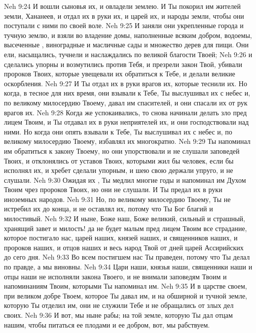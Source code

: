 \vs Neh 9:24 И вошли сыновья их, и овладели землею. И Ты покорил им жителей земли, Хананеев, и отдал их в руки их, и царей их, и народы земли, чтобы они поступали с ними по своей воле.
\vs Neh 9:25 И заняли они укрепленные города и тучную землю, и взяли во владение домы, наполненные всяким добром, водоемы, высеченные , виноградные и масличные сады и множество дерев  для пищи. Они ели, насыщались, тучнели и наслаждались по великой благости Твоей;
\vs Neh 9:26 и сделались упорны и возмутились против Тебя, и презрели закон Твой, убивали пророков Твоих, которые увещевали их обратиться к Тебе, и делали великие оскорбления.
\vs Neh 9:27 И Ты отдал их в руки врагов их, которые теснили их. Но когда, в тесное для них время, они взывали к Тебе, Ты выслушивал их с небес и, по великому милосердию Твоему, давал им спасителей, и они спасали их от рук врагов их.
\vs Neh 9:28 Когда же успокаивались, то снова начинали делать зло пред лицем Твоим, и Ты отдавал их в руки неприятелей их, и они господствовали над ними. Но когда они опять взывали к Тебе, Ты выслушивал их с небес и, по великому милосердию Твоему, избавлял их многократно.
\vs Neh 9:29 Ты напоминал им обратиться к закону Твоему, но они упорствовали и не слушали заповедей Твоих, и отклонялись от уставов Твоих, которыми жил бы человек, если бы исполнял их, и хребет  сделали упорным, и шею свою держали упруго, и не слушали.
\vs Neh 9:30 Ожидая их , Ты медлил многие годы и напоминал им Духом Твоим чрез пророков Твоих, но они не слушали. И Ты предал их в руки иноземных народов.
\vs Neh 9:31 Но, по великому милосердию Твоему, Ты не истребил их до конца, и не оставлял их, потому что Ты Бог благий и милостивый.
\vs Neh 9:32 И ныне, Боже наш, Боже великий, сильный и страшный, хранящий завет и милость! да не будет малым пред лицем Твоим все страдание, которое постигало нас, царей наших, князей наших, и священников наших, и пророков наших, и отцов наших и весь народ Твой от дней царей Ассирийских до сего дня.
\vs Neh 9:33 Во всем постигшем нас Ты праведен, потому что Ты делал по правде, а мы виновны.
\vs Neh 9:34 Цари наши, князья наши, священники наши и отцы наши не исполняли закона Твоего, и не внимали заповедям Твоим и напоминаниям Твоим, которыми Ты напоминал им.
\vs Neh 9:35 И в царстве своем, при великом добре Твоем, которое Ты давал им, и на обширной и тучной земле, которую Ты отделил им, они не служили Тебе и не обращались от злых дел своих.
\vs Neh 9:36 И вот, мы ныне рабы; на той земле, которую Ты дал отцам нашим, чтобы питаться ее плодами и ее добром, вот, мы рабствуем.
